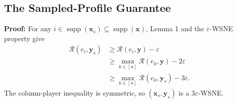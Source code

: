 \subsection{The Sampled-Profile Guarantee}
\label{app:sampled-wsne-proof}

\textbf{Proof:} For any $i \in \operatorname{supp}(\mathbf{x}_s) \subseteq \operatorname{supp}(\mathbf{x})$, Lemma 1 and the $\varepsilon$-WSNE property give
\begin{align*}
  \mathcal{R}(e_i, \mathbf{y}_s)
   & \ge \mathcal{R}(e_i, \mathbf{y})-\varepsilon                  \\
   & \ge \max_{k\in[n]}\mathcal{R}(e_k,\mathbf{y})-2\varepsilon    \\
   & \ge \max_{k\in[n]}\mathcal{R}(e_k,\mathbf{y}_s)-3\varepsilon.
\end{align*}
The column-player inequality is symmetric, so $(\mathbf{x}_s,\mathbf{y}_s)$ is a $3\varepsilon$-WSNE.
